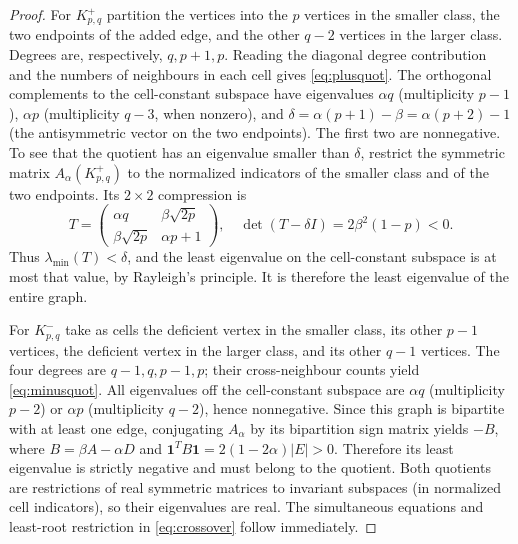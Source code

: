\documentclass[11pt]{amsart}
\theoremstyle{definition}
\begin{document}
\begin{proof}
For $K_{p,q}^{+}$ partition the vertices into the $p$ vertices in the smaller class, the two endpoints of the added edge, and the other $q-2$ vertices in the larger class. Degrees are, respectively, $q,p+1,p$. Reading the diagonal degree contribution and the numbers of neighbours in each cell gives \eqref{eq:plusquot}. The orthogonal complements to the cell-constant subspace have eigenvalues $\alpha q$ (multiplicity $p-1$), $\alpha p$ (multiplicity $q-3$, when nonzero), and $\delta=\alpha(p+1)-\beta=\alpha(p+2)-1$ (the antisymmetric vector on the two endpoints). The first two are nonnegative. To see that the quotient has an eigenvalue smaller than $\delta$, restrict the symmetric matrix $A_\alpha(K_{p,q}^{+})$ to the normalized indicators of the smaller class and of the two endpoints. Its $2\times2$ compression is
\[
 T=\begin{pmatrix}\alpha q&\beta\sqrt{2p}\\\beta\sqrt{2p}&\alpha p+1\end{pmatrix},
 \quad \det(T-\delta I)=2\beta^2(1-p)<0.
\]
Thus $\lambda_{\min}(T)<\delta$, and the least eigenvalue on the cell-constant subspace is at most that value, by Rayleigh's principle. It is therefore the least eigenvalue of the entire graph.

For $K_{p,q}^{-}$ take as cells the deficient vertex in the smaller class, its other $p-1$ vertices, the deficient vertex in the larger class, and its other $q-1$ vertices. The four degrees are $q-1,q,p-1,p$; their cross-neighbour counts yield \eqref{eq:minusquot}. All eigenvalues off the cell-constant subspace are $\alpha q$ (multiplicity $p-2$) or $\alpha p$ (multiplicity $q-2$), hence nonnegative. Since this graph is bipartite with at least one edge, conjugating $A_\alpha$ by its bipartition sign matrix yields $-B$, where $B=\beta A-\alpha D$ and $\mathbf1^TB\mathbf1=2(1-2\alpha)|E|>0$. Therefore its least eigenvalue is strictly negative and must belong to the quotient. Both quotients are restrictions of real symmetric matrices to invariant subspaces (in normalized cell indicators), so their eigenvalues are real. The simultaneous equations and least-root restriction in \eqref{eq:crossover} follow immediately.
\end{proof}
\end{document}
